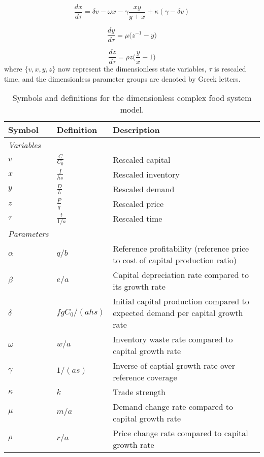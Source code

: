 \documentclass[12pt]{article}
\begin{document}
\begin{equation}
  \frac{dx}{d\tau} = \delta v - \omega x - \gamma \frac{xy}{y + x} + \kappa ( \gamma - \delta v)
  \label{dimensionless_inventory}
\end{equation}

\begin{equation}
  \frac{dy}{d\tau} = \mu \Big( z^{-1} - y\Big)
\end{equation}

\begin{equation}
  \frac{dz}{d\tau} = \rho z\Big(\frac{y}{x} - 1\Big)
\end{equation}
%
where $\{v, x, y, z\}$ now represent the dimensionless state variables, $\tau$ is rescaled time, and the dimensionless parameter groups are denoted by Greek letters.

\begin{table}[t!]
  \centering
  \footnotesize
  \begin{tabular}{p{2cm}p{2cm}p{7cm}}
    \textbf{Symbol} & \textbf{Definition} & \textbf{Description} \\ \hline
    \textit{Variables} &\\
    $v$  & $\frac{C}{C_0}$    & Rescaled capital        \\
    $x$  & $\frac{I}{hs}$  & Rescaled inventory      \\
    $y$  & $\frac{D}{h}$  & Rescaled demand             \\
    $z$  & $\frac{P}{q}$  & Rescaled price               \\
    $\tau$  & $\frac{t}{1/a}$  & Rescaled time\\
    \textit{Parameters} &\\
    $\alpha$   & $q/b$  & Reference profitability (reference price to cost of capital production ratio)\\
    $\beta$    & $e/a$  & Capital depreciation rate compared to its growth rate\\
    $\delta$    & $f g C_{0}/(ahs)$ & Initial capital production compared to expected demand per capital growth rate\\
    $\omega$    & $w/a$ & Inventory waste rate compared to capital growth rate\\
    $\gamma$    & $1/(as)$ & Inverse of captial growth rate over reference coverage\\
    $\kappa$    & $k$    & Trade strength \\
    $\mu$       & $m/a$  & Demand change rate compared to capital growth rate\\
    $\rho$      & $r/a$  & Price change rate compared to capital growth rate\\
    \hline
  \end{tabular}
  \caption{Symbols and definitions for the dimensionless complex food system model.}
  \label{t_nd_symbols}
\end{table}
\end{document}
